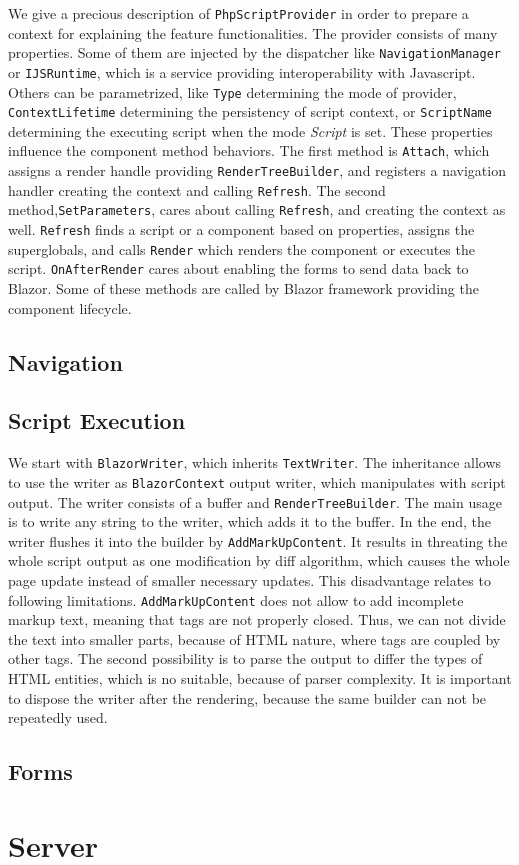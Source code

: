 \par
We give a precious description of \texttt{PhpScriptProvider} in order to prepare a context for explaining the feature functionalities.
The provider consists of many properties.
Some of them are injected by the dispatcher like \texttt{NavigationManager} or \texttt{IJSRuntime}, which is a service providing interoperability with Javascript.
Others can be parametrized, like \texttt{Type} determining the mode of provider, \texttt{ContextLifetime} determining the persistency of script context, or \texttt{ScriptName} determining the executing script when the mode \textit{Script} is set.
These properties influence the component method behaviors.
The first method is \texttt{Attach}, which assigns a render handle providing \texttt{RenderTreeBuilder}, and registers a navigation handler creating the context and calling \texttt{Refresh}.
The second method,\texttt{SetParameters}, cares about calling \texttt{Refresh}, and creating the context as well.
\texttt{Refresh} finds a script or a component based on properties, assigns the superglobals, and calls \texttt{Render} which renders the component or executes the script.
\texttt{OnAfterRender} cares about enabling the forms to send data back to Blazor.
Some of these methods are called by Blazor framework providing the component lifecycle.

\subsection{Navigation}
\subsection{Script Execution}
We start with \texttt{BlazorWriter}, which inherits \texttt{TextWriter}.
The inheritance allows to use the writer as \texttt{BlazorContext} output writer, which manipulates with script output.
The writer consists of a buffer and \texttt{RenderTreeBuilder}.
The main usage is to write any string to the writer, which adds it to the buffer.
In the end, the writer flushes it into the builder by \texttt{AddMarkUpContent}.
It results in threating the whole script output as one modification by diff algorithm, which causes the whole page update instead of smaller necessary updates.
This disadvantage relates to following limitations.
\texttt{AddMarkUpContent} does not allow to add incomplete markup text, meaning that tags are not properly closed.
Thus, we can not divide the text into smaller parts, because of HTML nature, where tags are coupled by other tags.
The second possibility is to parse the output to differ the types of HTML entities, which is no suitable, because of parser complexity.
It is important to dispose the writer after the rendering, because the same builder can not be repeatedly used.
\subsection{Forms}

\par

\section{Server}

